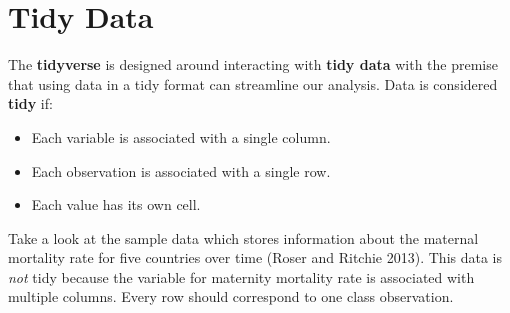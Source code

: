 \documentclass[
  letterpaper,
]{latex/krantz}
\makeatletter
\newenvironment{Shaded}{\begin{snugshade}}{\end{snugshade}}
\newcommand{\CommentTok}[1]{\textcolor[rgb]{0.37,0.37,0.37}{#1}}
\newcommand{\DecValTok}[1]{\textcolor[rgb]{0.68,0.00,0.00}{#1}}
\newcommand{\FunctionTok}[1]{\textcolor[rgb]{0.28,0.35,0.67}{#1}}
\newcommand{\NormalTok}[1]{\textcolor[rgb]{0.00,0.23,0.31}{#1}}
\newcommand{\OtherTok}[1]{\textcolor[rgb]{0.00,0.23,0.31}{#1}}
\newcommand{\SpecialCharTok}[1]{\textcolor[rgb]{0.37,0.37,0.37}{#1}}
\newcommand{\StringTok}[1]{\textcolor[rgb]{0.13,0.47,0.30}{#1}}
\newenvironment{kframe}{%
\medskip{}
\setlength{\fboxsep}{.8em}
 \def\at@end@of@kframe{}%
 \ifinner\ifhmode%
  \def\at@end@of@kframe{\end{minipage}}%
  \begin{minipage}{\columnwidth}%
 \fi\fi%
 \def\FrameCommand##1{\hskip\@totalleftmargin \hskip-\fboxsep
 \colorbox{shadecolor}{##1}\hskip-\fboxsep
     \hskip-\linewidth \hskip-\@totalleftmargin \hskip\columnwidth}%
 \MakeFramed {\advance\hsize-\width
   \@totalleftmargin\z@ \linewidth\hsize
   \@setminipage}}%
 {\par\unskip\endMakeFramed%
 \at@end@of@kframe}
\renewenvironment{Shaded}{\begin{kframe}}{\end{kframe}}
\makeatother
\begin{document}
\begin{Shaded}
\end{Shaded}

\section{Tidy Data}\label{tidy-data}

The \textbf{tidyverse} is designed around interacting with \textbf{tidy
data}  with the premise that using data in a tidy
format can streamline our analysis. Data is considered \textbf{tidy} if:

\begin{itemize}
\item
  Each variable is associated with a single column.
\item
  Each observation is associated with a single row.
\item
  Each value has its own cell.
\end{itemize}

Take a look at the sample data which stores information about the
maternal mortality rate for five countries over time (Roser and Ritchie
2013). This data is \emph{not} tidy because the variable for maternity
mortality rate is associated with multiple columns. Every row should
correspond to one class observation.
\end{document}
